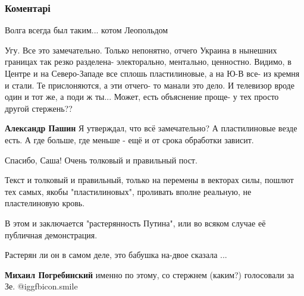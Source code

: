  
 
 
 
 
\subsubsection{Коментарі}
\label{sec:25_10_2021.fb.karevin_aleksandr.1.plastilin_ukraincy.cmt}

\begin{itemize} %
Волга всегда был таким... котом Леопольдом


Угу. Все это замечательно. Только непонятно, отчего Украина в нынешних границах
так резко разделена- электорально, ментально, ценностно. Видимо, в Центре и на
Северо-Западе все сплошь пластилиновые, а на Ю-В все- из кремня и стали. Те
прислоняются, а эти отчего- то манали это дело. И телевизор вроде один и тот
же, а поди ж ты... Может, есть объяснение проще- у тех просто другой стержень??

\begin{itemize} %
\textbf{Александр Пашин} Я утверждал, что всё замечательно? А пластилиновые везде есть. А где больше, где меньше - ещё и от срока обработки зависит.
\end{itemize} %


Спасибо, Саша! Очень толковый и правильный пост.

\begin{itemize} %

Текст и толковый и правильный, только на перемены в векторах силы, пошлют тех
самых, якобы "пластилиновых", проливать вполне реальную, не пластелиновую
кровь.

В этом и заключается "растерянность Путина", или во всяком случае её публичная
демонстрация.

Растерян ли он в самом деле, это бабушка на-двое сказала ...

\textbf{Михаил Погребинский} именно по этому, со стержнем (каким?) голосовали за Зе.  @igg{fbicon.smile} 


\end{itemize}
\end{itemize}
